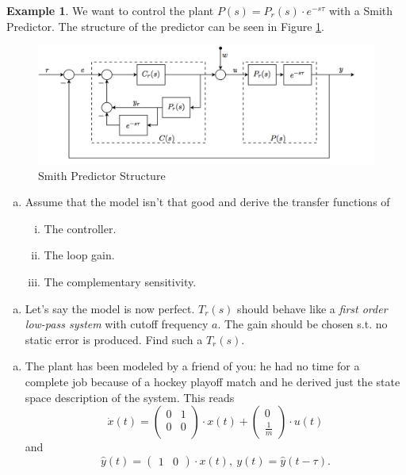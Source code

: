 \documentclass[a4paper,12 pt]{article}
\numberwithin{equation}{section}
\theoremstyle{definition}
\newtheorem{bsp}{Example}
\theoremstyle{remark}
\theoremstyle{definition}
\theoremstyle{definition}
\theoremstyle{definition}
\theoremstyle{remark}
\begin{document}
\begin{bsp}
We want to control the plant $P(s)=P_r(s)\cdot e^{-s\tau}$ with a Smith Predictor. The structure of the predictor can be seen in Figure \ref{fig:smith3}.
\begin{figure}[h!]
\begin{center}
\includegraphics[width=0.86\columnwidth]{smith3.png}
\caption{Smith Predictor Structure}
\label{fig:smith3}
\end{center}
\end{figure}

\begin{enumerate}[(a)]
\item Assume that the model isn't that good and derive the transfer functions of
\begin{enumerate}[i)]
\item The controller.
\item The loop gain.
\item The complementary sensitivity.
\end{enumerate}

\end{enumerate}

\begin{enumerate}[(b)]
\item Let's say the model is now perfect. $T_r(s)$ should behave like a \textit{first order low-pass system} with cutoff frequency $a$. The gain should be chosen s.t. no static error is produced. Find such a $T_r(s)$. 
\end{enumerate}

\begin{enumerate}[(c)]
\item The plant has been modeled by a friend of you: he had no time for a complete job because of a hockey playoff match and he derived just the state space description of the system. This reads
\begin{equation*}
\dot{x}(t)=\begin{pmatrix}
0 & 1\\
0&0\\
\end{pmatrix} \cdot x(t)+\begin{pmatrix}
0\\
\frac{1}{m}
\end{pmatrix}\cdot u(t)
\end{equation*}
and
\begin{equation*}
\hat{y}(t)=\begin{pmatrix}
1&0
\end{pmatrix} \cdot x(t), \  y(t)=\hat{y}(t-\tau).
\end{equation*}


\end{enumerate}
\end{bsp}
\end{document}
